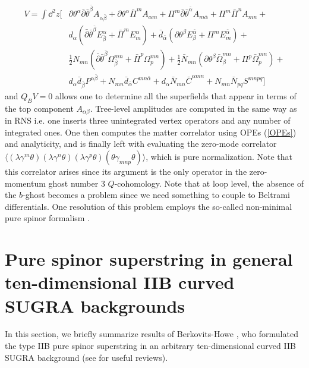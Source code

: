 \documentclass[12pt]{article}
\def\be{\begin{equation}}
\def\ee{\end{equation}}
\numberwithin{equation}{section}
\begin{document}
\be
\begin{aligned}
	\label{integratedOp}
	V = \int \dd^2 z \Big[&\partial \theta^\alpha \bar{\partial}\bar{\theta}^{\bar{\beta}} A_{\alpha \bar{\beta}} + \partial \theta^\alpha \bar{\Pi}^m A_{\alpha m} + \Pi^m \bar{\partial}\bar{\theta}^{\bar{\alpha}} A_{m\bar{\alpha}} + \Pi^m \bar{\Pi}^n A_{mn} + \\ & d_\alpha(\bar{\partial}\bar{\theta}^{\bar{\beta}} E^\alpha_{\bar{\beta}} + \bar{\Pi}^m E^\alpha_m) + \bar{d}_{\bar{\alpha}}(\partial \theta^\beta E^{\bar{\alpha}}_\beta + \Pi^m E^{\bar{\alpha}}_m) + \\
			      & \frac{1}{2} N_{mn}(\bar{\partial}\bar{\theta}^{\bar{\beta}} \Omega^{mn}_{\bar{\beta}} + \bar{\Pi}^p \Omega_p^{mn}) + \frac{1}{2} \bar{N}_{mn}(\partial \theta^\beta \bar{\Omega}^{mn}_\beta + \Pi^p \bar{\Omega}_p^{mn}) + \\
			      & d_\alpha \bar{d}_{\bar{\beta}} P^{\alpha \bar{\beta}} + N_{mn} \bar{d}_{\bar{\alpha}} C^{mn\bar{\alpha}} + d_\alpha \bar{N}_{mn} \bar{C}^{\alpha mn} + N_{mn}\bar{N}_{pq} S^{mnpq}\Big]
\end{aligned}
\ee
and $Q_B V = 0$ allows one to determine all the superfields that appear in terms of the top component $A_{\alpha \beta}$. Tree-level amplitudes are computed in the same way as in RNS i.e. one inserts three unintegrated vertex operators and any number of integrated ones. One then computes the matter correlator using OPEs (\ref{OPEs}) and analyticity, and is finally left with evaluating the zero-mode correlator $\langle (\lambda \gamma^m \theta)(\lambda \gamma^n \theta)(\lambda \gamma^p \theta)(\theta \gamma_{mnp}\theta)\rangle$, which is pure normalization. Note that this correlator arises since its argument is the only operator in the zero-momentum ghost number 3 $Q$-cohomology. Note that at loop level, the absence of the $b$-ghost becomes a problem since we need something to couple to Beltrami differentials. One resolution of this problem employs the so-called non-minimal pure spinor formalism \cite{Berkovits:2005bt}.


\section{Pure spinor superstring in general ten-dimensional IIB curved SUGRA backgrounds}
\label{genCurved}

In this section, we briefly summarize results of Berkovits-Howe \cite{Berkovits:2001ue}, who formulated the type IIB pure spinor superstring in an arbitrary ten-dimensional curved IIB SUGRA background (see \cite{Guttenberg:2007vba, Mazzucato:2011jt} for useful reviews).
\end{document}
